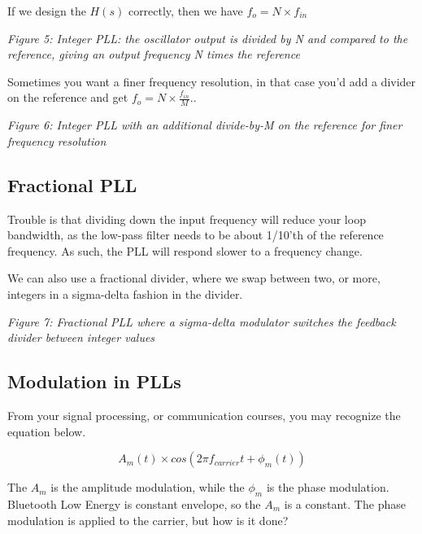 If we design the \(H(s)\) correctly, then we have
\(f_o = N \times f_{in}\)


{
\centering
{}
}

\emph{Figure 5: Integer PLL: the oscillator output is divided by N and
compared to the reference, giving an output frequency N times the
reference}

Sometimes you want a finer frequency resolution, in that case you'd add
a divider on the reference and get \(f_o = N \times \frac{f_{in}}{M}\)..


{
\centering
{}
}

\emph{Figure 6: Integer PLL with an additional divide-by-M on the
reference for finer frequency resolution}

\subsection{Fractional PLL}\label{fractional-pll}

Trouble is that dividing down the input frequency will reduce your loop
bandwidth, as the low-pass filter needs to be about 1/10'th of the
reference frequency. As such, the PLL will respond slower to a frequency
change.

We can also use a fractional divider, where we swap between two, or
more, integers in a sigma-delta fashion in the divider.


{
\centering
{}
}

\emph{Figure 7: Fractional PLL where a sigma-delta modulator switches
the feedback divider between integer values}

\subsection{Modulation in PLLs}\label{modulation-in-plls}

From your signal processing, or communication courses, you may recognize
the equation below.

\[ A_m(t) \times cos\left( 2 \pi f_{carrier}t + \phi_{m}(t)\right)\]

The \(A_m\) is the amplitude modulation, while the \(\phi_m\) is the
phase modulation. Bluetooth Low Energy is constant envelope, so the
\(A_m\) is a constant. The phase modulation is applied to the carrier,
but how is it done?

